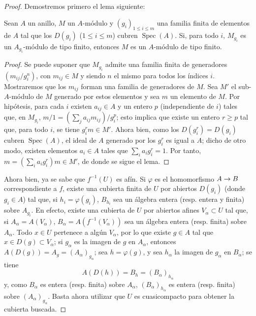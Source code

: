 \documentclass[oneside,10pt]{amsart}
\makeatletter
\renewcommand{\leq}{\leqslant}
\renewcommand{\geq}{\geqslant}
\newcommand{\ega@arrow}[2]{\mathchoice{#1}{#2}{#2}{#2}}
\renewcommand{\to}{\ega@arrow{\longrightarrow}{\rightarrow}}
\newcommand{\oldpage}[2][]{\marginnote{\normalfont\footnotesize\textbf{#1}~|~#2}\ignorespaces}
\let\EGAOriginalLabel\label
\renewcommand{\label}[1]{\phantomsection\EGAOriginalLabel{#1}}
\makeatother
\begin{document}
\oldpage[II]{111}
\begin{proof}
Demostremos primero el lema siguiente:

  \begin{lemma}[6.1.4.1]
  \label{II.6.1.4.1-fr}
  Sean $A$ un anillo, $M$ un $A$-módulo y $(g_i)_{1\leq i\leq m}$ una familia finita de elementos de $A$ tal que los $D(g_i)$ ($1\leq i\leq m$) cubren $\operatorname{Spec}(A)$.
  Si, para todo $i$, $M_{g_i}$ es un $A_{g_i}$-módulo de tipo finito, entonces $M$ es un $A$-módulo de tipo finito.
  \end{lemma}

  \begin{proof}
  Se puede suponer que $M_{g_i}$ admite una familia finita de generadores $(m_{ij}/g_i^n)$, con $m_{ij}\in M$ y siendo $n$ el mismo para todos los índices $i$.
  Mostraremos que los $m_{ij}$ forman una familia de generadores de $M$.
  Sea $M'$ el sub-$A$-módulo de $M$ generado por estos elementos y sea $m$ un elemento de $M$.
  Por hipótesis, para cada $i$ existen $a_{ij}\in A$ y un entero $p$ (independiente de $i$) tales que, en $M_{g_i}$, $m/1=(\sum_j a_{ij}m_{ij})/g_i^p$;
  esto implica que existe un entero $r\geq p$ tal que, para todo $i$, se tiene $g_i^r m\in M'$.
  Ahora bien, como los $D(g_i^r)=D(g_i)$ cubren $\operatorname{Spec}(A)$, el ideal de $A$ generado por los $g_i^r$ es igual a $A$; dicho de otro modo, existen elementos $a_i\in A$ tales que $\sum_i a_i g_i^r=1$.
  Por tanto, $m=(\sum_i a_i g_i^r)m\in M'$, de donde se sigue el lema.
  \end{proof}

Ahora bien, ya se sabe  que $f^{-1}(U)$ es afín.
Si $\varphi$ es el homomorfismo $A\to B$ correspondiente a $f$, existe una cubierta finita de $U$ por abiertos $D(g_i)$ (donde $g_i\in A$) tal que, si $h_i=\varphi(g_i)$, $B_{h_i}$ sea un álgebra entera (resp. entera y finita) sobre $A_{g_i}$.
En efecto, existe una cubierta de $U$ por abiertos afines $V_\alpha\subset U$ tal que, si $A_\alpha=A(V_\alpha)$, $B_\alpha=A(f^{-1}(V_\alpha))$ sea un álgebra entera (resp. finita) sobre $A_\alpha$.
Todo $x\in U$ pertenece a algún $V_\alpha$, por lo que existe $g\in A$ tal que $x\in D(g)\subset V_\alpha$;
si $g_\alpha$ es la imagen de $g$ en $A_\alpha$, entonces $A(D(g))=A_g=(A_\alpha)_{g_\alpha}$;
sea $h=\varphi(g)$, y sea $h_\alpha$ la imagen de $g_\alpha$ en $B_\alpha$;
se tiene
\[
A(D(h))=B_h=(B_\alpha)_{h_\alpha}
\]
y, como $B_\alpha$ es entera (resp. finita) sobre $A_\alpha$, $(B_\alpha)_{h_\alpha}$ es entera (resp. finita) sobre $(A_\alpha)_{g_\alpha}$.
Basta ahora utilizar que $U$ es cuasicompacto para obtener la cubierta buscada.


\end{proof}
\end{document}

